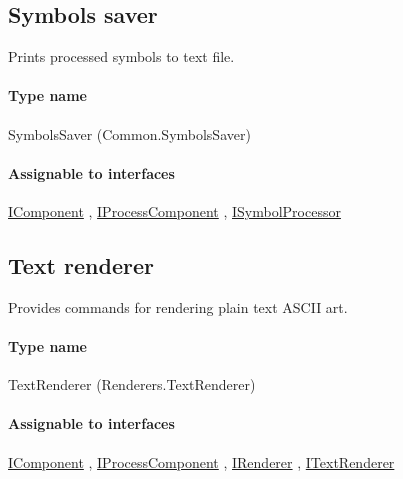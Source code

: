 

\subsection{Symbols saver}
\label{Malsys.Processing.Components.Common.SymbolsSaver}
Prints processed symbols to text file.\paragraph{Type name}
SymbolsSaver (Common.SymbolsSaver) 	\paragraph{Assignable to interfaces}
		\hyperref[Malsys.Processing.Components.IComponent]{IComponent}%
, 		\hyperref[Malsys.Processing.Components.IProcessComponent]{IProcessComponent}%
, 		\hyperref[Malsys.Processing.Components.ISymbolProcessor]{ISymbolProcessor}%
	


\subsection{Text renderer}
\label{Malsys.Processing.Components.Renderers.TextRenderer}
Provides commands for rendering plain text ASCII art.\paragraph{Type name}
TextRenderer (Renderers.TextRenderer) 	\paragraph{Assignable to interfaces}
		\hyperref[Malsys.Processing.Components.IComponent]{IComponent}%
, 		\hyperref[Malsys.Processing.Components.IProcessComponent]{IProcessComponent}%
, 		\hyperref[Malsys.Processing.Components.IRenderer]{IRenderer}%
, 		\hyperref[Malsys.Processing.Components.Renderers.ITextRenderer]{ITextRenderer}%
	


